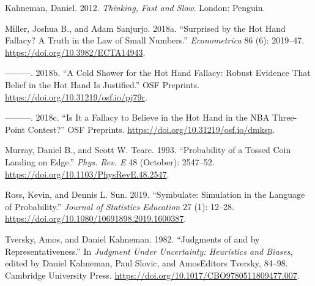 \documentclass[
  letterpaper,
  DIV=11,
  numbers=noendperiod]{scrreprt}
\newlength{\cslhangindent}
\newenvironment{CSLReferences}[2] %
 {\begin{list}{}{%
  \setlength{\itemindent}{0pt}
  \setlength{\leftmargin}{0pt}
  \setlength{\parsep}{0pt}
  \ifodd #1
   \setlength{\leftmargin}{\cslhangindent}
   \setlength{\itemindent}{-1\cslhangindent}
  \fi
  \setlength{\itemsep}{#2\baselineskip}}}
 {\end{list}}
\theoremstyle{plain}
\theoremstyle{definition}
\theoremstyle{definition}
\theoremstyle{definition}
\theoremstyle{remark}
\begin{document}
\begin{CSLReferences}{1}{0}
Kahneman, Daniel. 2012. \emph{Thinking, Fast and Slow}. London: Penguin.

Miller, Joshua B., and Adam Sanjurjo. 2018a. {``Surprised by the Hot
Hand Fallacy? A Truth in the Law of Small Numbers.''}
\emph{Econometrica} 86 (6): 2019--47.
\url{https://doi.org/10.3982/ECTA14943}.

---------. 2018b. {``A Cold Shower for the Hot Hand Fallacy: Robust
Evidence That Belief in the Hot Hand Is Justified.''} OSF Preprints.
\url{https://doi.org/10.31219/osf.io/pj79r}.

---------. 2018c. {``Is It a Fallacy to Believe in the Hot Hand in the
NBA Three-Point Contest?''} OSF Preprints.
\url{https://doi.org/10.31219/osf.io/dmksp}.

Murray, Daniel B., and Scott W. Teare. 1993. {``Probability of a Tossed
Coin Landing on Edge.''} \emph{Phys. Rev. E} 48 (October): 2547--52.
\url{https://doi.org/10.1103/PhysRevE.48.2547}.

Ross, Kevin, and Dennis L. Sun. 2019. {``Symbulate: Simulation in the
Language of Probability.''} \emph{Journal of Statistics Education} 27
(1): 12--28. \url{https://doi.org/10.1080/10691898.2019.1600387}.

Tversky, Amos, and Daniel Kahneman. 1982. {``Judgments of and by
Representativeness.''} In \emph{Judgment Under Uncertainty: Heuristics
and Biases}, edited by Daniel Kahneman, Paul Slovic, and AmosEditors
Tversky, 84--98. Cambridge University Press.
\url{https://doi.org/10.1017/CBO9780511809477.007}.

\end{CSLReferences}
\end{document}
